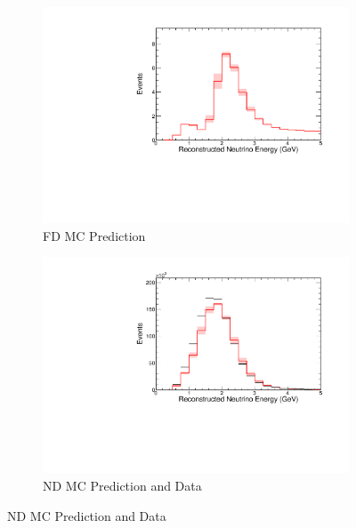 {\begin{figure}
\end{figure}



\begin{figure}
\begin{center}
\begin{subfigure}[c]{0.49\textwidth}
\includegraphics[width=\textwidth]{figures/systs/prediction/fd_mc_prediction_calScaleAbs.pdf}
\caption*{FD MC Prediction}
\end{subfigure}
\begin{subfigure}[c]{0.49\textwidth}
\includegraphics[width=\textwidth]{figures/systs/prediction/nd_mc_prediction_calScaleAbs.pdf}
\caption*{ND MC Prediction and Data}
\end{subfigure}

\vspace{20pt}


\end{center}
\end{figure}}

